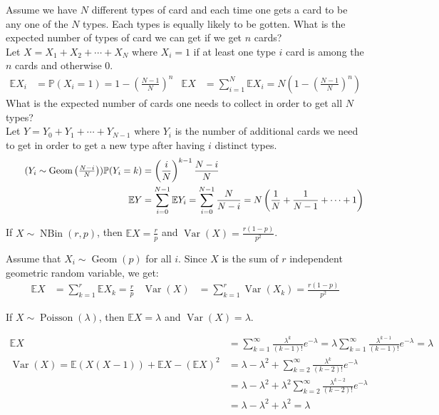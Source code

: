 \documentclass{huhtakm-template-book}
\newcommand{\prob}{\mathbb{P}}
\newcommand{\expect}{\mathbb{E}}
\DeclareMathOperator{\NBin}{NBin}
\DeclareMathOperator{\Geom}{Geom}
\DeclareMathOperator{\Poisson}{Poisson}
\DeclareMathOperator{\Var}{Var}
\begin{document}
\begin{eg}
	Assume we have $N$ different types of card and each time one gets a card to be any one of the $N$ types. Each types is equally likely to be gotten. What is the expected number of types of card we can get if we get $n$ cards?\\
	Let $X=X_{1}+X_{2}+\cdots+X_{N}$ where $X_{i}=1$ if at least one type $i$ card is among the $n$ cards and otherwise $0$.
	\begin{align*}
		\expect X_{i}&=\prob(X_{i}=1)=1-\left(\frac{N-1}{N}\right)^{n} & \expect X&=\sum_{i=1}^{N}\expect X_{i}=N\left(1-\left(\frac{N-1}{N}\right)^{n}\right)
	\end{align*}
	What is the expected number of cards one needs to collect in order to get all $N$ types?\\
	Let $Y=Y_{0}+Y_{1}+\cdots+Y_{N-1}$ where $Y_{i}$ is the number of additional cards we need to get in order to get a new type after having $i$ distinct types.
	\begin{align*}
		\tag{$Y_{i}\sim\Geom\left(\frac{N-i}{N}\right)$}
		\prob(Y_{i}=k)&=\left(\frac{i}{N}\right)^{k-1}\frac{N-i}{N}\\
		\expect Y&=\sum_{i=0}^{N-1}\expect Y_{i}=\sum_{i=0}^{N-1}\frac{N}{N-i}=N\left(\frac{1}{N}+\frac{1}{N-1}+\cdots+1\right)
	\end{align*}
\end{eg}
\begin{thm}
	If $X\sim\NBin(r,p)$, then $\expect{X}=\frac{r}{p}$ and $\Var(X)=\frac{r(1-p)}{p^{2}}$.
\end{thm}
\begin{proofing}
	Assume that $X_{i}\sim\Geom(p)$ for all $i$. Since $X$ is the sum of $r$ independent geometric random variable, we get:
	\begin{align*}
		\expect{X}&=\sum_{k=1}^{r}\expect{X_{k}}=\frac{r}{p} & \Var(X)&=\sum_{k=1}^{r}\Var(X_{k})=\frac{r(1-p)}{p^{2}}
	\end{align*}
\end{proofing}
\begin{thm}
	If $X\sim\Poisson(\lambda)$, then $\expect{X}=\lambda$ and $\Var(X)=\lambda$.
\end{thm}
\begin{proofing}
	\begin{align*}
		\expect{X}&=\sum_{k=1}^{\infty}\frac{\lambda^{k}}{(k-1)!}e^{-\lambda}=\lambda\sum_{k=1}^{\infty}\frac{\lambda^{k-1}}{(k-1)!}e^{-\lambda}=\lambda\\
		\Var(X)=\expect(X(X-1))+\expect{X}-(\expect{X})^{2}&=\lambda-\lambda^{2}+\sum_{k=2}^{\infty}\frac{\lambda^{k}}{(k-2)!}e^{-\lambda}\\
		&=\lambda-\lambda^{2}+\lambda^{2}\sum_{k=2}^{\infty}\frac{\lambda^{k-2}}{(k-2)!}e^{-\lambda}\\
		&=\lambda-\lambda^{2}+\lambda^{2}=\lambda
	\end{align*}
\end{proofing}
\end{document}
